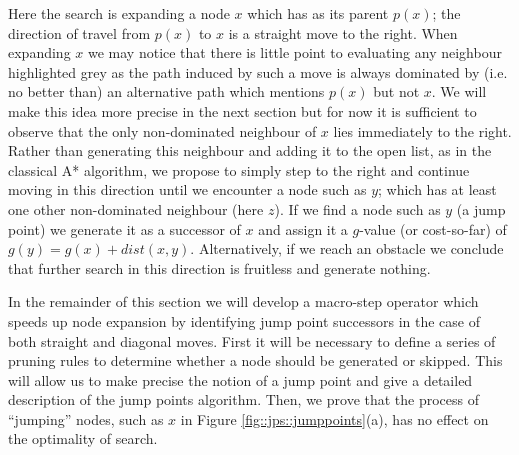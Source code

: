 Here the search is expanding a node $x$ which has as its parent $p(x)$;
the direction of travel from $p(x)$ to $x$ is a straight move to the right.
When expanding $x$ we may notice that there is little point to evaluating any
neighbour highlighted grey as the path induced by such a move is always
dominated by (i.e. no better than) an alternative path which mentions 
$p(x)$ but not $x$.
We will make this idea more precise in the next section but for now it is 
sufficient to observe that the only non-dominated neighbour of $x$ 
lies immediately to the right.
Rather than generating this neighbour and adding it to the open list,
as in the classical A* algorithm, we propose 
to simply step to the right and continue moving in this direction until we
encounter a node such as $y$; which has at least one other non-dominated
neighbour (here $z$). 
If we find a node such as $y$ (a jump point) we generate it as a successor 
of $x$ and assign it a $g$-value (or cost-so-far) of $g(y) = g(x) + dist(x,
y)$.
Alternatively, if we reach an obstacle we conclude that further search in this
direction is fruitless and generate nothing.
\par
In the remainder of this section we will develop a macro-step operator which 
speeds up node expansion by identifying jump point successors in the case of
both straight and diagonal moves. First it will be necessary to define a series of
pruning rules to determine whether a node should be generated 
or skipped. 
This will allow us to make precise the notion of a jump point and 
give a detailed description of the jump points algorithm.
Then, we prove that the process of ``jumping'' nodes, such as $x$ in 
Figure \ref{fig::jps::jumppoints}(a), has no effect on the optimality of search.



